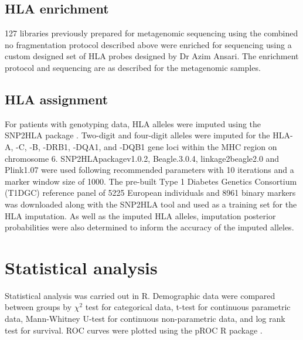 \subsection{HLA enrichment}
127 libraries previously prepared for metagenomic sequencing using the combined no fragmentation protocol described above were enriched for sequencing using a custom designed set of HLA probes designed by Dr Azim Ansari. The enrichment protocol and sequencing are as described for the metagenomic samples.

\subsection{HLA assignment}
For patients with genotyping data, HLA alleles were imputed using the SNP2HLA package \parencite{Jia2013}. Two-digit and four-digit alleles were imputed for the HLA-A, -C, -B, -DRB1, -DQA1, and -DQB1 gene loci within the MHC region on chromosome 6. SNP2HLApackagev1.0.2, Beagle.3.0.4, linkage2beagle2.0 and Plink1.07 were used following recommended parameters with 10 iterations and a marker window size of 1000. The pre-built Type 1 Diabetes Genetics Consortium (T1DGC) reference panel of 5225 European individuals and 8961 binary markers was downloaded along with the SNP2HLA tool and used as a training set for the HLA imputation. As well as the imputed HLA alleles, imputation posterior probabilities were also determined to inform the accuracy of the imputed alleles.

\section{Statistical analysis}
Statistical analysis was carried out in R. Demographic data were compared between groups by $\chi^2$ test for categorical data, t-test for continuous parametric data, Mann-Whitney U-test for continuous non-parametric data, and log rank test for survival. ROC curves were plotted using the pROC R package \parencite{Robin2011}. 
